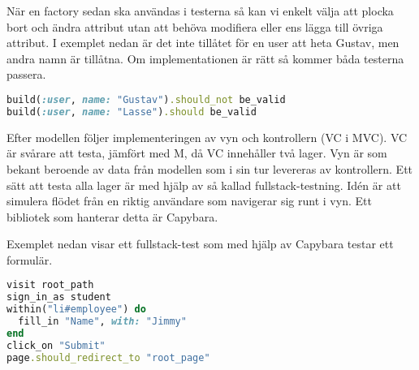 När en factory sedan ska användas i testerna så kan vi enkelt välja att plocka bort och ändra attribut utan att behöva modifiera eller ens lägga till övriga attribut. I exemplet nedan är det inte tillåtet för en user att heta Gustav, men andra namn är tillåtna. Om implementationen är rätt så kommer båda testerna passera.

\begin{lstlisting}[language=Ruby]
build(:user, name: "Gustav").should_not be_valid
build(:user, name: "Lasse").should be_valid
\end{lstlisting}

Efter modellen följer implementeringen av vyn och kontrollern (VC i MVC). VC är svårare att testa, jämfört med M, då VC innehåller två lager. Vyn är som bekant beroende av data från modellen som i sin tur levereras av kontrollern. Ett sätt att testa alla lager är med hjälp av så kallad fullstack-testning. Idén är att simulera flödet från en riktig användare som navigerar sig runt i vyn. Ett bibliotek som hanterar detta är Capybara.

Exemplet nedan visar ett fullstack-test som med hjälp av Capybara testar ett formulär.

\begin{lstlisting}[language=Ruby]
visit root_path
sign_in_as student
within("li#employee") do
  fill_in "Name", with: "Jimmy"
end
click_on "Submit"
page.should_redirect_to "root_page"
\end{lstlisting}
